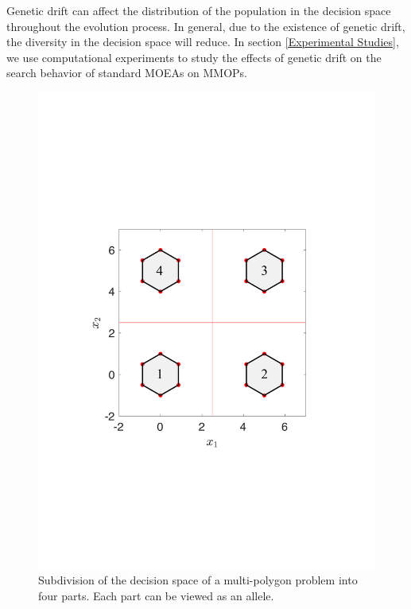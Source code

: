 \documentclass[conference]{IEEEtran}
\begin{document}
Genetic drift can affect the distribution of the population in the decision space throughout the evolution process. In general, due to the existence of genetic drift, the diversity in the decision space will reduce. In section \ref{Experimental Studies}, we use computational experiments to study the effects of genetic drift on the search behavior of standard MOEAs on MMOPs.

\begin{figure}[htbp]
    \centering
    \includegraphics[width=.3\textwidth]{Section3/Alleles}
    \caption{Subdivision of the decision space of a multi-polygon problem into four parts. Each part can be viewed as an allele.}
    \label{fig: Alleles}
\end{figure}
\end{document}
